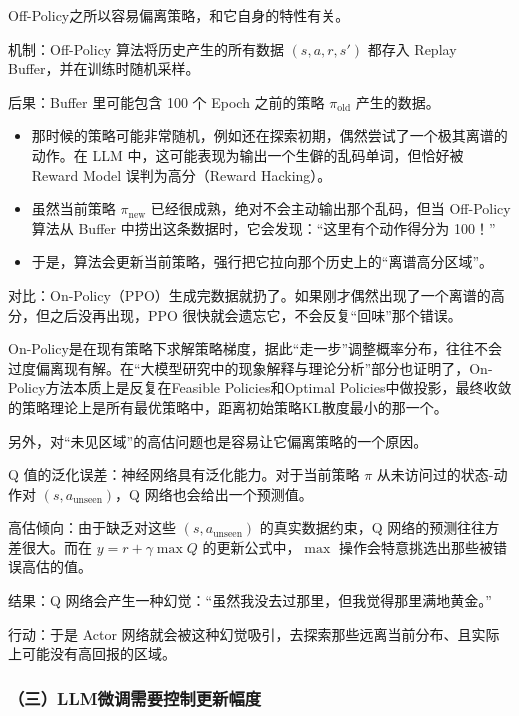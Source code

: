 Off-Policy之所以容易偏离策略，和它自身的特性有关。

机制：Off-Policy 算法将历史产生的所有数据 \((s,a,r,s')\) 都存入 Replay Buffer，并在训练时随机采样。

后果：Buffer 里可能包含 100 个 Epoch 之前的策略 \(\pi_{\mathrm{old}}\) 产生的数据。

\begin{itemize}
\tightlist
\item
  那时候的策略可能非常随机，例如还在探索初期，偶然尝试了一个极其离谱的动作。在 LLM 中，这可能表现为输出一个生僻的乱码单词，但恰好被 Reward Model 误判为高分（Reward Hacking）。
\item
  虽然当前策略 \(\pi_{\mathrm{new}}\) 已经很成熟，绝对不会主动输出那个乱码，但当 Off-Policy 算法从 Buffer 中捞出这条数据时，它会发现：``这里有个动作得分为 100！''
\item
  于是，算法会更新当前策略，强行把它拉向那个历史上的``离谱高分区域''。
\end{itemize}

对比：On-Policy（PPO）生成完数据就扔了。如果刚才偶然出现了一个离谱的高分，但之后没再出现，PPO 很快就会遗忘它，不会反复``回味''那个错误。

On-Policy是在现有策略下求解策略梯度，据此``走一步''调整概率分布，往往不会过度偏离现有解。在``大模型研究中的现象解释与理论分析''部分也证明了，On-Policy方法本质上是反复在Feasible Policies和Optimal Policies中做投影，最终收敛的策略理论上是所有最优策略中，距离初始策略KL散度最小的那一个。

另外，对``未见区域''的高估问题也是容易让它偏离策略的一个原因。

Q 值的泛化误差：神经网络具有泛化能力。对于当前策略 \(\pi\) 从未访问过的状态-动作对 \((s,a_{\mathrm{unseen}})\)，Q 网络也会给出一个预测值。

高估倾向：由于缺乏对这些 \((s,a_{\mathrm{unseen}})\) 的真实数据约束，Q 网络的预测往往方差很大。而在 \(y=r+\gamma\max Q\) 的更新公式中，\(\max\) 操作会特意挑选出那些被错误高估的值。

结果：Q 网络会产生一种幻觉：``虽然我没去过那里，但我觉得那里满地黄金。''

行动：于是 Actor 网络就会被这种幻觉吸引，去探索那些远离当前分布、且实际上可能没有高回报的区域。

\hypertarget{ux4e09llmux5faeux8c03ux9700ux8981ux63a7ux5236ux66f4ux65b0ux5e45ux5ea6}{%
\subsubsection{（三）LLM微调需要控制更新幅度}\label{ux4e09llmux5faeux8c03ux9700ux8981ux63a7ux5236ux66f4ux65b0ux5e45ux5ea6}}

